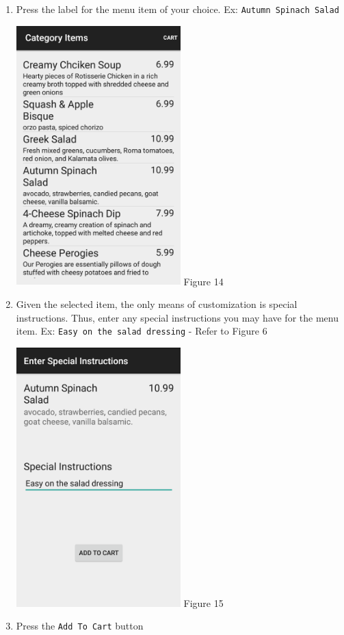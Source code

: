 \documentclass[12pt, titlepage]{article}
\begin{document}
\begin{enumerate}
		\item Press the label for the menu item of your choice. Ex: 					\texttt{Autumn Spinach Salad}
		\begin{center}
			\includegraphics[width=0.5\textwidth]{appetizers.png}
			\linebreak Figure 14
		\end{center}				
		
		\item Given the selected item, the only means of customization is special instructions. Thus, enter any special instructions you may have for the menu 					item. Ex: \texttt{Easy on the salad dressing} - Refer to Figure 			6
		\begin{center}
			\includegraphics[width=0.5\textwidth]{special-instructions.png}
			\linebreak Figure 15
		\end{center}		
	
		\item Press the \texttt{Add To Cart} button
	\end{enumerate}
\end{document}
